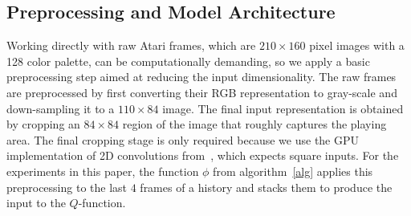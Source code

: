 




\subsection{Preprocessing and Model Architecture}

Working directly with raw Atari frames, which are $210\times 160$ pixel images with a 128 color palette, can be computationally demanding, so we apply a basic preprocessing step aimed at reducing the input dimensionality.  The raw frames are preprocessed by first converting their RGB representation to gray-scale and down-sampling it to a $110 \times 84$ image. The final input representation is obtained by cropping an $84\times 84$ region of the image that roughly captures the playing area. The final cropping stage is only required because we use the GPU implementation of 2D convolutions from~\cite{krizhevsky-imagenet}, which expects square inputs.  For the experiments in this paper, the function $\phi$ from algorithm~\ref{alg} applies this preprocessing to the last $4$ frames of a history and stacks them to produce the input to the $Q$-function. 

